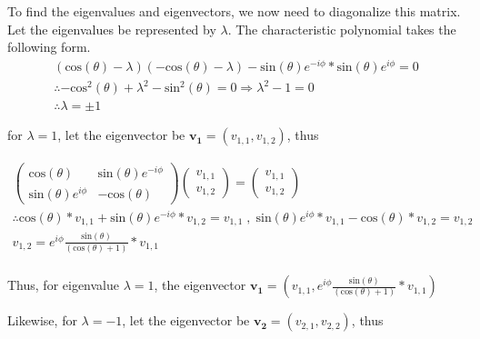     To find the eigenvalues and eigenvectors, we now need to diagonalize this matrix. Let the eigenvalues be represented by $\lambda$. The characteristic polynomial takes the following form.
    \begin{gather*}
        (\textrm{cos}(\theta) - \lambda)(-\textrm{cos}(\theta) - \lambda) - \textrm{sin}(\theta)e^{-i\phi}*\textrm{sin}(\theta)e^{i\phi} = 0 \\
        \therefore -\textrm{cos}^{2}(\theta) + \lambda^{2} - \textrm{sin}^{2}(\theta) = 0  \Rightarrow \lambda^{2} - 1 = 0 \\
        \therefore \lambda = \pm 1
    \end{gather*}

    for $\lambda = 1$, let the eigenvector be $\mathbf{v_{1}} = (v_{1,1}, v_{1,2})$, thus 
    
    \begin{gather*}
        \begin{pmatrix}
            \textrm{cos}(\theta) & \textrm{sin}(\theta)e^{-i\phi} \\
            \textrm{sin}(\theta)e^{i\phi} & -\textrm{cos}(\theta)
        \end{pmatrix}
        \begin{pmatrix}
            v_{1,1} \\
            v_{1,2}
        \end{pmatrix} = 
        \begin{pmatrix}
            v_{1,1} \\
            v_{1,2}
        \end{pmatrix} \\
        \therefore \textrm{cos}(\theta)*v_{1,1} + \textrm{sin}(\theta)e^{-i\phi}*v_{1,2} = v_{1,1} \; , \; \textrm{sin}(\theta)e^{i\phi}*v_{1,1} - \textrm{cos}(\theta)*v_{1,2} = v_{1,2} \\
        v_{1,2} = e^{i\phi}\frac{\textrm{sin}(\theta)}{(\textrm{cos}(\theta) + 1)}*v_{1,1} \\
    \end{gather*}

    Thus, for eigenvalue $\lambda = 1$, the eigenvector $\mathbf{v_{1}} = (v_{1,1}, e^{i\phi}\frac{\textrm{sin}(\theta)}{(\textrm{cos}(\theta) + 1)}*v_{1,1})$

    Likewise, for $\lambda = -1$, let the eigenvector be $\mathbf{v_{2}} = (v_{2,1}, v_{2,2})$, thus

